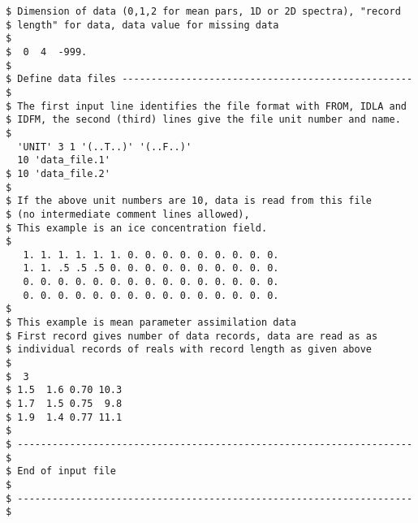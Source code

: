 \begin{footnotesize}
\begin{verbatim}
$ Dimension of data (0,1,2 for mean pars, 1D or 2D spectra), "record
$ length" for data, data value for missing data
$
$  0  4  -999.
$
$ Define data files -------------------------------------------------- $
$ The first input line identifies the file format with FROM, IDLA and
$ IDFM, the second (third) lines give the file unit number and name.
$
  'UNIT' 3 1 '(..T..)' '(..F..)' 
  10 'data_file.1'
$ 10 'data_file.2'
$
$ If the above unit numbers are 10, data is read from this file
$ (no intermediate comment lines allowed),
$ This example is an ice concentration field.
$
   1. 1. 1. 1. 1. 1. 0. 0. 0. 0. 0. 0. 0. 0. 0.
   1. 1. .5 .5 .5 0. 0. 0. 0. 0. 0. 0. 0. 0. 0.
   0. 0. 0. 0. 0. 0. 0. 0. 0. 0. 0. 0. 0. 0. 0.
   0. 0. 0. 0. 0. 0. 0. 0. 0. 0. 0. 0. 0. 0. 0.
$
$ This example is mean parameter assimilation data
$ First record gives number of data records, data are read as as
$ individual records of reals with record length as given above
$
$  3
$ 1.5  1.6 0.70 10.3
$ 1.7  1.5 0.75  9.8
$ 1.9  1.4 0.77 11.1
$
$ -------------------------------------------------------------------- $
$ End of input file                                                    $
$ -------------------------------------------------------------------- $
\end{verbatim}
\end{footnotesize}
